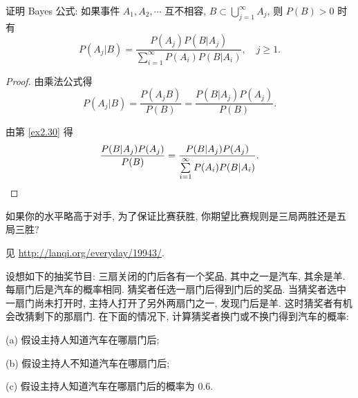 \documentclass{ctexart}
\begin{document}
\begin{exercise}%
    证明 Bayes 公式: 如果事件 $A_1,A_2,\cdots$ 互不相容, $B\subset\bigcup\limits_{j=1}^\infty A_j$, 则 $P(B)>0$ 时有
    \[P(A_j|B)=\dfrac{P(A_j)P(B|A_j)}{\sum\limits_{i=1}^\infty P(A_i)P(B|A_i)},\quad j\geq1.\]
\end{exercise}
\begin{proof}
    由乘法公式得
    \[P(A_j|B)=\dfrac{P(A_jB)}{P(B)}=\dfrac{P(B|A_j)P(A_j)}{P(B)}.\]

    由第 \ref{ex2.30} 得
    \[\dfrac{P(B|A_j)P(A_j)}{P(B)}=\dfrac{P(B|A_j)P(A_j)}{\sum\limits_{i=1}^\infty P(A_i)P(B|A_i)}.\qedhere\]
\end{proof}
\begin{exercise}%
    如果你的水平略高于对手, 为了保证比赛获胜, 你期望比赛规则是三局两胜还是五局三胜?
\end{exercise}
\begin{solution}
    见 \url{http://lanqi.org/everyday/19943/}.
\end{solution}
\begin{exercise}%
    设想如下的抽奖节目: 三扇关闭的门后各有一个奖品, 其中之一是汽车, 其余是羊. 每扇门后是汽车的概率相同. 猜奖者任选一扇门后得到门后的奖品. 当猜奖者选中一扇门尚未打开时, 主持人打开了另外两扇门之一, 发现门后是羊. 这时猜奖者有机会改猜剩下的那扇门. 在下面的情况下, 计算猜奖者换门或不换门得到汽车的概率:

    (a) 假设主持人知道汽车在哪扇门后;

    (b) 假设主持人不知道汽车在哪扇门后;

    (c) 假设主持人知道汽车在哪扇门后的概率为 $0.6$.
\end{exercise}
\end{document}
